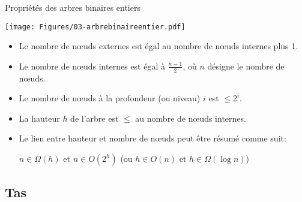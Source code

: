 \begin{frame}{Propriétés des arbres binaires entiers}
\label{sec3:proparbres}
\centerline{\texttt{[image: Figures/03-arbrebinaireentier.pdf]}}

\begin{itemize}
\item Le nombre de n\oe uds externes est égal au nombre de n\oe uds internes plus 1.
\item Le nombre de n\oe uds internes est égal à $\frac{n-1}{2}$, où
  $n$ désigne le nombre de n\oe uds.
\item Le nombre de n\oe uds à la profondeur (ou niveau) $i$ est $\leq 2^i$.
\item La hauteur $h$ de l'arbre est $\leq$ au nombre de n\oe uds internes.
\item Le lien entre hauteur et nombre de n\oe uds peut être résumé comme suit:
\begin{center}
$n\in \Omega(h)\mbox{ et }n\in O(2^h)$ (ou $h\in O(n)\mbox{ et }h\in \Omega(\log n)$)
\end{center}
\end{itemize}

\end{frame}

\subsection{Tas}

